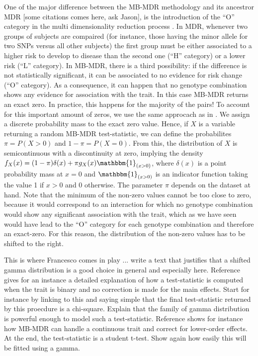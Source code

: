 \documentclass{bmcart}
\begin{document}
One of the major difference between the MB-MDR methodology and its ancestror MDR [some citations comes here, ask Jason], is the introduction of the ``O'' category in the multi dimensionality reduction process \cite{Calle2008,Cattaert2011}. In MDR, whenever two groups of subjects are compaired (for instance, those having the minor allele for two SNPs versus all other subjects) the first group must be either associated to a higher risk to develop to disease than the second one (``H'' category) or a lower risk (``L'' category). In MB-MDR, there is a third possibility: if the difference is not statistically significant, it can be associated to no evidence for risk change (``O'' category). As a consequence, it can happen that no genotype combination shows any evidence for association with the trait. In this case MB-MDR returns an exact zero. In practice, this happens for the majority of the pairs! To account for this important amount of zeros, we use the same approcach as in \cite{Hautsch2013}. We assign a discrete probability mass to the exact zero value. Hence, if $X$ is a variable returning a random MB-MDR test-statistic, we can define the probabilites $\pi = P(X > 0)$ and $1-\pi = P(X = 0)$. From this, the distribution of $X$ is semicontinuous with a discontinuity at zero, implying the density $f_X(x) = (1-\pi) \delta(x) + \pi g_X(x) \mathbbm{1}_{(x>0)}$, where $\delta(x)$ is a point probability mass at $x=0$ and $\mathbbm{1}_{(x>0)}$ is an indicator function taking the value 1 if $x>0$ and 0 otherwise. The parameter $\pi$ depends on the dataset at hand. Note that the minimum of the non-zero values cannot be too close to zero, because it would correspond to an interaction for which no genotype combination would show any significant association with the trait, which as we have seen would have lead to the ``O'' category for each genotype combination and therefore an exact-zero. For this reason, the distribution of the non-zero values has to be shifted to the right.

{\color{red} This is where Francesco comes in play ... write a text that justifies that a shifted gamma distribution is a good choice in general and especially here. Reference \cite{VanLishout2013} gives for an instance a detailed explanation of how a test-statistic is computed when the trait is binary and no correction is made for the main effects. Start for instance by linking to this and saying simple that the final test-statistic returned by this proecdure is a chi-square. Explain that the family of gamma distribution is powerful enough to model such a test-statistic. Reference \cite{Mahachie2012} shows for instance how MB-MDR can handle a continuous trait and correct for lower-order effects. At the end, the test-statistic is a student t-test. Show again how easily this will be fitted using a gamma.}
\end{document}
